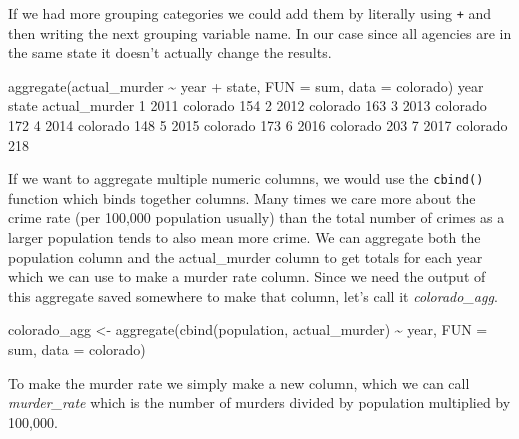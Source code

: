 \documentclass[
  12pt,
  openany]{book}
\newenvironment{Shaded}{\begin{snugshade}}{\end{snugshade}}
\newcommand{\AttributeTok}[1]{\textcolor[rgb]{0.61,0.61,0.61}{#1}}
\newcommand{\DecValTok}[1]{\textcolor[rgb]{0.06,0.06,0.06}{#1}}
\newcommand{\FunctionTok}[1]{\textcolor[rgb]{0,0,0}{#1}}
\newcommand{\NormalTok}[1]{#1}
\newcommand{\OtherTok}[1]{\textcolor[rgb]{0.37,0.37,0.37}{#1}}
\newcommand{\SpecialCharTok}[1]{\textcolor[rgb]{0,0,0}{#1}}
\begin{document}
If we had more grouping categories we could add them by literally using \texttt{+} and then writing the next grouping variable name. In our case since all agencies are in the same state it doesn't actually change the results.

\begin{Shaded}
\begin{Highlighting}[]
\FunctionTok{aggregate}\NormalTok{(actual\_murder }\SpecialCharTok{\textasciitilde{}}\NormalTok{ year }\SpecialCharTok{+}\NormalTok{ state, }\AttributeTok{FUN =}\NormalTok{ sum, }\AttributeTok{data =}\NormalTok{ colorado)}
\NormalTok{  year    state actual\_murder}
\DecValTok{1} \DecValTok{2011}\NormalTok{ colorado           }\DecValTok{154}
\DecValTok{2} \DecValTok{2012}\NormalTok{ colorado           }\DecValTok{163}
\DecValTok{3} \DecValTok{2013}\NormalTok{ colorado           }\DecValTok{172}
\DecValTok{4} \DecValTok{2014}\NormalTok{ colorado           }\DecValTok{148}
\DecValTok{5} \DecValTok{2015}\NormalTok{ colorado           }\DecValTok{173}
\DecValTok{6} \DecValTok{2016}\NormalTok{ colorado           }\DecValTok{203}
\DecValTok{7} \DecValTok{2017}\NormalTok{ colorado           }\DecValTok{218}
\end{Highlighting}
\end{Shaded}

If we want to aggregate multiple numeric columns, we would use the \texttt{cbind()} function which binds together columns. Many times we care more about the crime rate (per 100,000 population usually) than the total number of crimes as a larger population tends to also mean more crime. We can aggregate both the population column and the actual\_murder column to get totals for each year which we can use to make a murder rate column. Since we need the output of this aggregate saved somewhere to make that column, let's call it \emph{colorado\_agg}.

\begin{Shaded}
\begin{Highlighting}[]
\NormalTok{colorado\_agg }\OtherTok{\textless{}{-}} \FunctionTok{aggregate}\NormalTok{(}\FunctionTok{cbind}\NormalTok{(population, actual\_murder) }\SpecialCharTok{\textasciitilde{}}\NormalTok{ year, }\AttributeTok{FUN =}\NormalTok{ sum, }\AttributeTok{data =}\NormalTok{ colorado)}
\end{Highlighting}
\end{Shaded}

To make the murder rate we simply make a new column, which we can call \emph{murder\_rate} which is the number of murders divided by population multiplied by 100,000.
\end{document}
